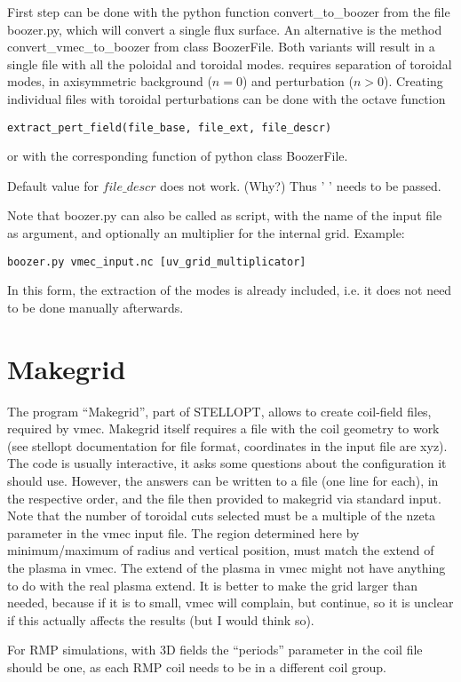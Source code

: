 \documentclass{article}
\begin{document}
First step can be done with the python function convert\_to\_boozer
from the file boozer.py, which will convert a single flux surface.
An alternative is the method convert\_vmec\_to\_boozer from class
BoozerFile.
Both variants will result in a single file with all the poloidal and toroidal
modes. \neotwo requires separation of toroidal modes, in axisymmetric
background ($n = 0$) and perturbation ($n > 0$).
Creating individual files  with toroidal perturbations can be done with
the octave function
\begin{verbatim}
extract_pert_field(file_base, file_ext, file_descr)
\end{verbatim}
or with the corresponding function of python class BoozerFile.

Default value for $file\_descr$ does not work. (Why?) Thus ' ' needs to
be passed.

Note that boozer.py can also be called as script, with the name of the
input file as argument, and optionally an multiplier for the internal
grid. Example:
\begin{verbatim}
boozer.py vmec_input.nc [uv_grid_multiplicator]
\end{verbatim}
In this form, the extraction of the modes is already included, i.e. it
does not need to be done manually afterwards.


\section{Makegrid}
The program ``Makegrid'', part of STELLOPT, allows to create coil-field
files, required by vmec.
Makegrid itself requires a file with the coil geometry to work (see
stellopt documentation for file format, coordinates in the input file
are xyz). The code is usually
interactive, it asks some questions about the configuration it should
use. However, the answers can be written to a file (one line for each),
in the respective order, and the file then provided to makegrid via
standard input.
Note that the number of toroidal cuts selected must be a multiple of the
nzeta parameter in the vmec input file.
The region determined here by minimum/maximum of radius and vertical
position, must match the extend of the plasma in vmec. The extend of the
plasma in vmec might not have anything to do with the real plasma
extend. It is better to make the grid larger than needed, because if it
is to small, vmec will complain, but continue, so it is unclear if this
actually affects the results (but I would think so).

For RMP simulations, with 3D fields the ``periods'' parameter in the
coil file should be one, as each RMP coil needs to be in a different
coil group.
\end{document}
